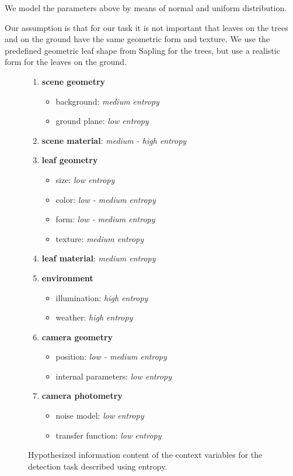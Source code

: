 \documentclass[fleqn,10pt]{SelfArx} %
\begin{document}
We model the parameters above by means of normal and uniform distribution. 

Our assumption is that for our task it is not important that leaves on the trees and on the ground have the same geometric form and texture. We use the predefined geometric leaf shape from Sapling for the trees, but use a realistic form for the leaves on the ground.

\begin{figure}[ht]
\begin{enumerate}[nolistsep]
	\item \textbf{scene geometry} 
	\begin{itemize}
		\item background: \textit{medium entropy}
		\item ground plane: \textit{low entropy}
	\end{itemize}
	\item \textbf{scene material}: \textit{medium - high entropy}
	\item \textbf{leaf geometry}
	\begin{itemize}
		\item size: \textit{low entropy}
		\item color: \textit{low - medium entropy}
		\item form: \textit{low - medium entropy}
		\item texture: \textit{medium entropy}
	\end{itemize}
	\item \textbf{leaf material}: \textit{medium entropy}
	\item \textbf{environment}
	\begin{itemize}
		\item illumination: \textit{high entropy}
		\item weather: \textit{high entropy}
	\end{itemize}
	\item \textbf{camera geometry}
	\begin{itemize}
		\item position: \textit{low - medium entropy}
		\item internal parameters: \textit{low entropy}
	\end{itemize}
	\item \textbf{camera photometry}
	\begin{itemize}
		\item noise model: \textit{low entropy}
		\item transfer function: \textit{low entropy}
	\end{itemize}
	
\end{enumerate}
\caption{Hypothesized information content of the context variables for the detection task described using entropy.}
\label{fig:InformationContent}
\end{figure}
\end{document}
